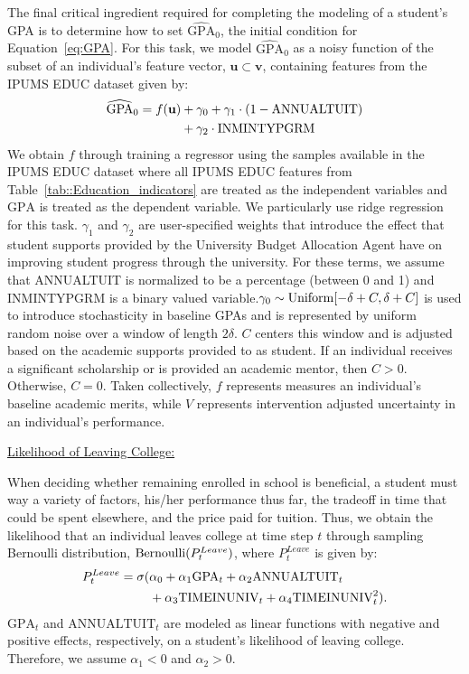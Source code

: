 The final critical ingredient required for completing the modeling of a student's GPA is to determine how to set $\widehat{\text{GPA}}_{0}$, the initial condition for Equation~\ref{eq:GPA}. For this task, we model $\widehat{\text{GPA}}_{0}$ as a noisy function of the subset of an individual's feature vector, $\mathbf{u}\subset \mathbf{v}$, containing features from the IPUMS EDUC dataset given by: 
\begin{align}
    \label{eq:init_GPA}
    \widehat{\text{GPA}}_{0} = f(\mathbf{u}) &+ \gamma_0 + \gamma_1\cdot (1-\text{ANNUALTUIT}) \notag \\
    &+ \gamma_2\cdot \text{INMINTYPGRM} 
\end{align}
We obtain $f$ through training a regressor using the samples available in the IPUMS EDUC dataset where all IPUMS EDUC features from Table~\ref{tab::Education_indicators} are treated as the independent variables and $\text{GPA}$ is treated as the dependent variable. We particularly use ridge regression for this task. $\gamma_1$ and $\gamma_2$ are user-specified weights that introduce the effect that student supports provided by the University Budget Allocation Agent have on improving student progress through the university. For these terms, we assume that ANNUALTUIT is normalized to be a percentage (between 0 and 1) and INMINTYPGRM is a binary valued variable.$\gamma_0\sim {\rm Uniform}[-\delta+C,\delta+C]$ is used to introduce stochasticity in baseline GPAs and is represented by uniform random noise over a window of length $2\delta$. $C$ centers this window and is adjusted based on the academic supports provided to as student. If an individual receives a significant scholarship or is provided an academic mentor, then $C>0$. Otherwise, $C=0$.  Taken collectively, $f$ represents measures an individual's baseline academic merits, while $V$ represents intervention adjusted uncertainty in an individual's performance.

\underline{Likelihood of Leaving College:}

When deciding whether remaining enrolled in school is beneficial, a student must way a variety of factors, his/her performance thus far, the tradeoff in time that could be spent elsewhere, and the price paid for tuition. Thus, we obtain the likelihood that an individual leaves college at time step $t$ through sampling Bernoulli distribution, ${\rm Bernoulli}(P^{Leave}_t)$, where $P^{Leave}_t$ is given by:
\begin{align}
    P^{Leave}_t = \sigma(&\alpha_0+\alpha_1\text{GPA}_t + \alpha_2\text{ANNUALTUIT}_t \notag\\
    &+ \alpha_3\text{TIMEINUNIV}_t + \alpha_4\text{TIMEINUNIV}_t^2).
\end{align}
$\text{GPA}_t$ and $\text{ANNUALTUIT}_t$ are modeled as linear functions with negative and positive effects, respectively, on a student's likelihood of leaving college. Therefore, we assume $\alpha_1 < 0$ and $\alpha_2 > 0$.

